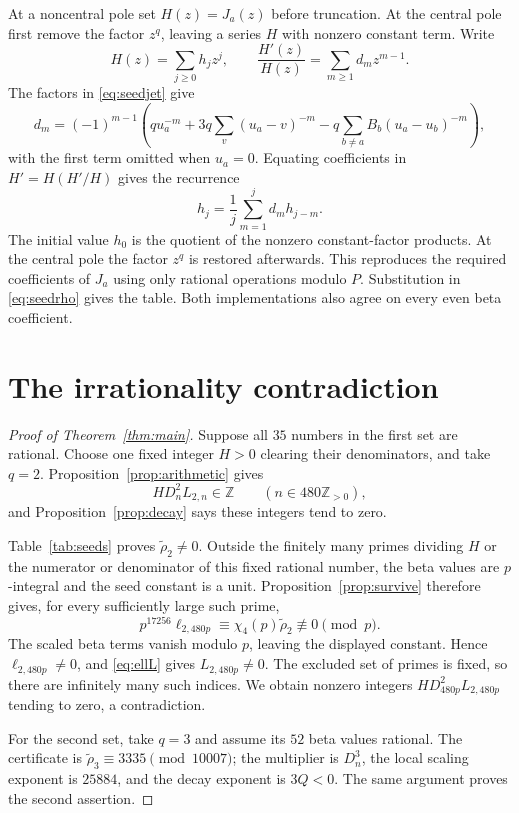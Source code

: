 \documentclass[11pt]{article}
\newcommand{\Z}{\mathbb Z}\newcommand{\Q}{\mathbb Q}
\begin{document}
At a noncentral pole set $H(z)=J_a(z)$ before truncation. At the central
pole first remove the factor $z^q$, leaving a series $H$ with nonzero
constant term. Write
\[
 H(z)=\sum_{j\ge0}h_jz^j,\qquad
 \frac{H'(z)}{H(z)}=\sum_{m\ge1}d_mz^{m-1}.
\]
The factors in \eqref{eq:seedjet} give
\[
 d_m=(-1)^{m-1}\left(q u_a^{-m}
       +3q\sum_v(u_a-v)^{-m}
       -q\sum_{b\ne a}B_b(u_a-u_b)^{-m}\right),
\]
with the first term omitted when $u_a=0$. Equating coefficients in
$H'=H(H'/H)$ gives the recurrence
\[
 h_j=\frac1j\sum_{m=1}^j d_mh_{j-m}.
\]
The initial value $h_0$ is the quotient of the nonzero constant-factor
products. At the central pole the factor $z^q$ is restored afterwards.
This reproduces the required coefficients of $J_a$ using only rational
operations modulo $P$. Substitution in \eqref{eq:seedrho} gives the
table. Both implementations also agree on every even beta coefficient.

\section{The irrationality contradiction}\label{sec:contradiction}
\begin{proof}[Proof of Theorem~\ref{thm:main}]
Suppose all $35$ numbers in the first set are rational. Choose one fixed
integer $H>0$ clearing their denominators, and take $q=2$.
Proposition~\ref{prop:arithmetic} gives
\[
 H D_n^2L_{2,n}\in\Z\qquad(n\in480\Z_{>0}),
\]
and Proposition~\ref{prop:decay} says these integers tend to zero.

Table~\ref{tab:seeds} proves $\widetilde\rho_2\ne0$. Outside the
finitely many primes dividing $H$ or the numerator or denominator of
this fixed rational number, the beta values are $p$-integral and the
seed constant is a unit. Proposition~\ref{prop:survive} therefore gives,
for every sufficiently large such prime,
\[
 p^{17256}\ell_{2,480p}\equiv
       \chi_4(p)\widetilde\rho_2\not\equiv0\pmod p.
\]
The scaled beta terms vanish modulo $p$, leaving the displayed constant.
Hence $\ell_{2,480p}\ne0$, and \eqref{eq:ellL} gives $L_{2,480p}\ne0$.
The excluded set of primes is fixed, so there are infinitely many such
indices. We obtain nonzero integers $H D_{480p}^2L_{2,480p}$ tending to
zero, a contradiction.

For the second set, take $q=3$ and assume its $52$ beta values rational.
The certificate is $\widetilde\rho_3\equiv3335\pmod{10007}$; the
multiplier is $D_n^3$, the local scaling exponent is $25884$, and the
decay exponent is $3Q<0$. The same argument proves the second assertion.
\end{proof}
\end{document}
